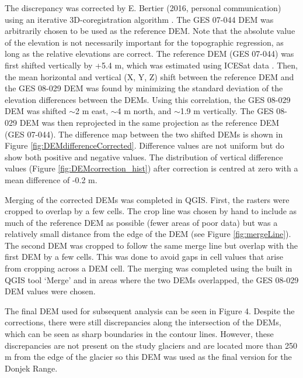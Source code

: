 \documentclass{sfuthesis}
\begin{document}
The discrepancy was corrected by E. Bertier (2016, personal communication) using an iterative 3D-coregistration algorithm \citep{Berthier2007}. The GES 07-044 DEM was arbitrarily chosen to be used as the reference DEM. Note that the absolute value of the elevation is not necessarily important for the topographic regression, as long as the relative elevations are correct. The reference DEM (GES 07-044) was first shifted vertically by +5.4 m, which was estimated using ICESat data \citep{Berthier2010}. Then, the mean horizontal and vertical (X, Y, Z) shift between the reference DEM and the GES 08-029 DEM was found by minimizing the standard deviation of the elevation differences between the DEMs. Using this correlation, the GES 08-029 DEM  was shifted $\sim$2 m east, $\sim$4 m north, and $\sim$1.9 m vertically. The GES 08-029 DEM was then reprojected in the same projection as the reference DEM (GES 07-044). The difference map between the two shifted DEMs is shown in Figure \ref{fig:DEMdifferenceCorrected}. Difference values are not uniform but do show both positive and negative values. The distribution of vertical difference values (Figure \ref{fig:DEMcorrection_hist}) after correction is centred at zero with a mean difference of -0.2 m.

Merging of the corrected DEMs was completed in QGIS. First, the rasters were cropped to overlap by a few cells. The crop line was chosen by hand to include as much of the reference DEM as possible (fewer areas of poor data) but was a relatively small distance from the edge of the DEM (see Figure \ref{fig:mergeLine}). The second DEM was cropped to follow the same merge line but overlap with the first DEM by a few cells. This was done to avoid gaps in cell values that arise from cropping across a DEM cell. The merging was completed using the built in QGIS tool `Merge' and in areas where the two DEMs overlapped, the GES 08-029 DEM values were chosen.

The final DEM used for subsequent analysis can be seen in Figure 4. Despite the corrections, there were still discrepancies along the intersection of the DEMs, which can be seen as sharp boundaries in the contour lines. However, these discrepancies are not present on the study glaciers and are located more than 250 m from the edge of the glacier so this DEM was used as the final version for the Donjek Range.

\begin{figure}
  \label{fig:finalDEM}
\end{figure}
\end{document}
